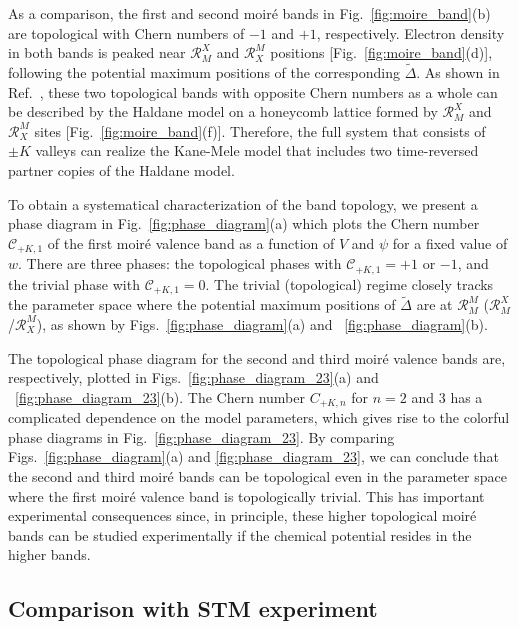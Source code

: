 \documentclass[aps,prx,floatfix,twocolumn]{revtex4-1}
\begin{document}
	As a comparison, the first and second moir\'e bands in Fig.~\ref{fig:moire_band}(b) are topological with Chern numbers of $-1$ and $+1$, respectively. Electron density in both bands is peaked near $\mathcal{R}_M^X$ and $\mathcal{R}_X^M$ positions [Fig.~\ref{fig:moire_band}(d)], following the potential maximum positions of the corresponding $\tilde{\Delta}$. As shown in Ref.~, these two topological bands with opposite Chern numbers as a whole can be described by the Haldane model \cite{haldane1988model} on a honeycomb lattice formed by $\mathcal{R}_M^X$ and $\mathcal{R}_X^M$ sites [Fig.~\ref{fig:moire_band}(f)]. Therefore, the full system that consists of $\pm K$ valleys can realize the Kane-Mele model \cite{kane2005quantum} that includes two time-reversed partner copies of the Haldane model.
	
	To obtain a systematical characterization of the band topology, we present a phase diagram in Fig.~\ref{fig:phase_diagram}(a) which plots the Chern number $\mathcal{C}_{+K, 1}$ of the first moir\'e valence band as a function of $V$ and $\psi$ for a fixed value of $w$. There are three phases: the topological phases with $ \mathcal{C}_{+K,1}=  +1$  or $-1$,  and the trivial phase with $ \mathcal{C}_{+K,1}=0 $. The trivial (topological) regime closely tracks the parameter space where the potential maximum positions of $\tilde{\Delta}$ are at $\mathcal{R}_M^M$ ($\mathcal{R}_M^X$/$\mathcal{R}_X^M$), as shown by Figs.~\ref{fig:phase_diagram}(a) and ~\ref{fig:phase_diagram}(b).
	
	The topological phase diagram for the second and third moir\'e valence bands are, respectively, plotted in Figs.~\ref{fig:phase_diagram_23}(a) and ~\ref{fig:phase_diagram_23}(b). The Chern number $C_{+K, n}$ for $n=2$ and $3$ has a complicated dependence on the model parameters, which gives rise to the colorful phase diagrams in Fig.~\ref{fig:phase_diagram_23}. By comparing Figs.~\ref{fig:phase_diagram}(a) and \ref{fig:phase_diagram_23}, we can conclude that the second and third moir\'e bands can be topological even in the parameter space where the first moir\'e valence band is topologically trivial. This has important experimental consequences since, in principle, these higher topological moir\'e bands can be studied experimentally if the chemical potential resides in the higher bands.
		
	\subsection{Comparison with STM experiment}
	
\end{document}
